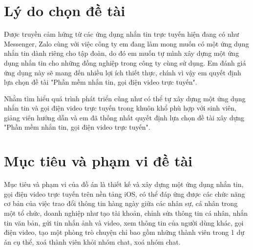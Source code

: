 \documentclass[../DoAn.tex]{subfiles}
\begin{document}
\section{Lý do chọn đề tài}
\label{section:1.1}
Được truyền cảm hứng từ các ứng dụng nhắn tin trực tuyến hiện đang có như Messenger, Zalo cùng với việc công ty em đang làm mong muốn có một ứng dụng nhắn tin dành riêng cho tập đoàn, do đó em muốn tự mình xây dựng một ứng dụng nhắn tin cho những đồng nghiệp trong công ty cùng sử dụng. Em đánh giá ứng dụng này sẽ mang đến nhiều lợi ích thiết thực, chính vì vậy em quyết định lựa chọn đề tài "Phần mềm nhắn tin, gọi điện video trực tuyến".

Nhằm tìm hiểu quá trình phát triển cũng như có thể tự xây dựng một ứng dụng nhắn tin và  gọi điện video trực tuyến trong khuôn khổ phù hợp với sinh viên, giảng viên hướng dẫn và em đã thống nhất quyết định lựa chọn đề tài xây dựng "Phần mềm nhắn tin, gọi điện video trực tuyến".

\section{Mục tiêu và phạm vi đề tài}
\label{section:1.2}
Mục tiêu và phạm vi của đồ án là thiết kế và xây dựng một ứng dụng nhắn tin, gọi điện video trực tuyến trên nền tảng iOS, có thể đáp ứng được các chức năng cơ bản của việc trao đổi thông tin hàng ngày giữa các nhân sự, cá nhân trong một tổ chức, doanh nghiệp như tạo tài khoản, chỉnh sửa thông tin cá nhân, nhắn tin văn bản, gửi tin nhắn ảnh và video, xem thông tin của người dùng khác, gọi điện video, tạo một phòng trò chuyện chỉ bao gồm những thành viên trong 1 dự án cụ thể, xoá thành viên khỏi nhóm chat, xoá nhóm chat.


\end{document}
